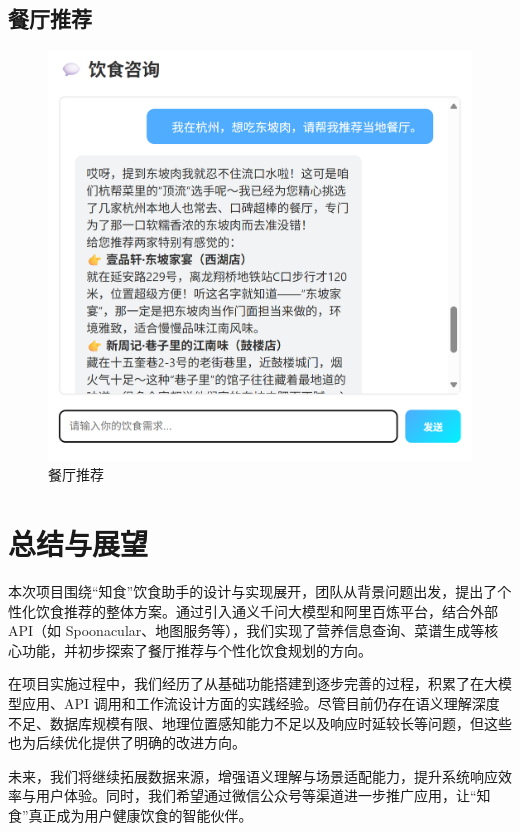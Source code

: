 \documentclass[a4paper,UTF8]{ctexart}
\begin{document}
\subsection{餐厅推荐}
\begin{figure}[H]
    \centering
    \includegraphics[width=0.8\linewidth,height=0.4\textheight,keepaspectratio]{4.png}
    \caption{餐厅推荐}
    \label{fig:diet_recommend}
\end{figure}

\section{总结与展望}
本次项目围绕“知食”饮食助手的设计与实现展开，团队从背景问题出发，提出了个性化饮食推荐的整体方案。通过引入通义千问大模型和阿里百炼平台，结合外部 API（如 Spoonacular、地图服务等），我们实现了营养信息查询、菜谱生成等核心功能，并初步探索了餐厅推荐与个性化饮食规划的方向。
\par
在项目实施过程中，我们经历了从基础功能搭建到逐步完善的过程，积累了在大模型应用、API 调用和工作流设计方面的实践经验。尽管目前仍存在语义理解深度不足、数据库规模有限、地理位置感知能力不足以及响应时延较长等问题，但这些也为后续优化提供了明确的改进方向。
\par
未来，我们将继续拓展数据来源，增强语义理解与场景适配能力，提升系统响应效率与用户体验。同时，我们希望通过微信公众号等渠道进一步推广应用，让“知食”真正成为用户健康饮食的智能伙伴。
\end{document}

